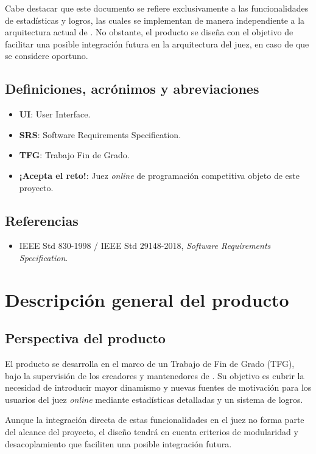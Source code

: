 Cabe destacar que este documento se refiere exclusivamente a las funcionalidades de estadísticas y logros, las cuales se implementan de manera independiente a la arquitectura actual de \aer. No obstante, el producto se diseña con el objetivo de facilitar una posible integración futura en la arquitectura del juez, en caso de que se considere oportuno.

\subsection{Definiciones, acrónimos y abreviaciones}

\begin{itemize}
    \item \textbf{UI}: User Interface.
    \item \textbf{SRS}: Software Requirements Specification.
    \item \textbf{TFG}: Trabajo Fin de Grado.
    \item \textbf{¡Acepta el reto!}: Juez \textit{online} de programación competitiva objeto de este proyecto.
\end{itemize}

\subsection{Referencias}

\begin{itemize}
    \item IEEE Std 830-1998 / IEEE Std 29148-2018, \textit{Software Requirements Specification}.
\end{itemize}

\section{Descripción general del producto}

\subsection{Perspectiva del producto}

El producto se desarrolla en el marco de un Trabajo de Fin de Grado (TFG), bajo la supervisión de los creadores y mantenedores de \aer. Su objetivo es cubrir la necesidad de introducir mayor dinamismo y nuevas fuentes de motivación para los usuarios del juez \textit{online} mediante estadísticas detalladas y un sistema de logros.

Aunque la integración directa de estas funcionalidades en el juez no forma parte del alcance del proyecto, el diseño tendrá en cuenta criterios de modularidad y desacoplamiento que faciliten una posible integración futura.

